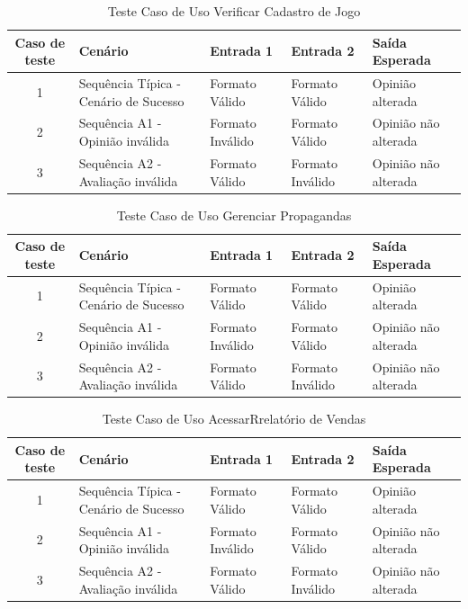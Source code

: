 \documentclass[a4paper,11pt]{article}
\begin{document}
	\begin{center}
	\begin{table}[H]
		\begin{tabularx}{\textwidth}{c|X|X|X|X}
			\textbf{Caso de teste} & \textbf{Cenário} & \textbf{Entrada 1} & \textbf{Entrada 2} & \textbf{Saída Esperada} \\
			\hline
			1 & Sequência Típica - Cenário de Sucesso & Formato Válido & Formato Válido & Opinião alterada\\ \hline
			2 & Sequência A1 - Opinião inválida & Formato Inválido & Formato Válido & Opinião não alterada\\ \hline
			3 & Sequência A2 - Avaliação inválida & Formato Válido & Formato Inválido & Opinião não alterada\\ \hline
			
		\end{tabularx}
		\caption{Teste Caso de Uso Verificar Cadastro de Jogo}
	\end{table}
	\end{center}
	
	\begin{center}
	\begin{table}[H]
		\begin{tabularx}{\textwidth}{c|X|X|X|X}
			\textbf{Caso de teste} & \textbf{Cenário} & \textbf{Entrada 1} & \textbf{Entrada 2} & \textbf{Saída Esperada} \\
			\hline
			1 & Sequência Típica - Cenário de Sucesso & Formato Válido & Formato Válido & Opinião alterada\\ \hline
			2 & Sequência A1 - Opinião inválida & Formato Inválido & Formato Válido & Opinião não alterada\\ \hline
			3 & Sequência A2 - Avaliação inválida & Formato Válido & Formato Inválido & Opinião não alterada\\ \hline
			
		\end{tabularx}
		\caption{Teste Caso de Uso Gerenciar Propagandas}
	\end{table}
	\end{center}
	
	\begin{center}
	\begin{table}[H]
		\begin{tabularx}{\textwidth}{c|X|X|X|X}
			\textbf{Caso de teste} & \textbf{Cenário} & \textbf{Entrada 1} & \textbf{Entrada 2} & \textbf{Saída Esperada} \\
			\hline
			1 & Sequência Típica - Cenário de Sucesso & Formato Válido & Formato Válido & Opinião alterada\\ \hline
			2 & Sequência A1 - Opinião inválida & Formato Inválido & Formato Válido & Opinião não alterada\\ \hline
			3 & Sequência A2 - Avaliação inválida & Formato Válido & Formato Inválido & Opinião não alterada\\ \hline
			
		\end{tabularx}
		\caption{Teste Caso de Uso AcessarRrelatório de Vendas}
	\end{table}
	\end{center}	
	
\end{document}

